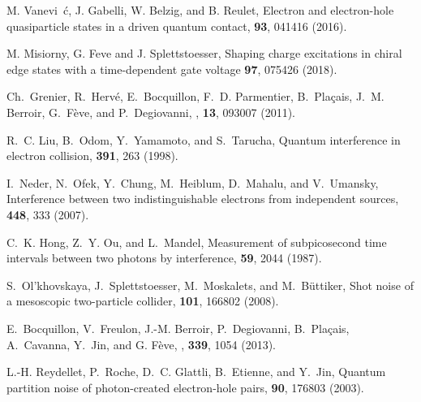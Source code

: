 \documentclass[aps,prb,superscriptaddress,preprint]{revtex4-1}
\begin{document}
\begin{thebibliography}{1}
		M. Vanevi\ifmmode~\else \'{c}\fi{}, J. Gabelli, W.
		Belzig, and B. Reulet,
		\newblock Electron and electron-hole quasiparticle states in a driven quantum
		contact,
		 {\bf 93}, 041416 (2016).
		
		
		
		
		M. Misiorny, G. Feve and J. Splettstoesser,
		\newblock Shaping charge excitations in chiral edge states with a time-dependent gate voltage
		 {\bf 97}, 075426 (2018).
		
		
		Ch.~Grenier, R.~Herv{\'e}, E.~Bocquillon, F.~D. Parmentier, B.~Pla\c{c}ais, J.~M.
		Berroir, G.~F{\`e}ve, and P.~Degiovanni,
		,
		 {\bf 13}, 093007 (2011).
		
		R.~C. Liu, B.~Odom, Y.~Yamamoto, and S.~Tarucha,
		\newblock Quantum interference in electron collision,
		  {\bf 391}, 263 (1998).
		
		I.~Neder, N.~Ofek, Y.~Chung, M.~Heiblum, D.~Mahalu, and V.~Umansky,
		\newblock Interference between two indistinguishable electrons from independent
		sources,
		 {\bf 448}, 333 (2007).
		
		C.~K. Hong, Z.~Y. Ou, and L.~Mandel,
		\newblock Measurement of subpicosecond time intervals between two photons by
		interference,
		 {\bf 59}, 2044 (1987).
		
		S.~Ol'khovskaya, J.~Splettstoesser, M.~Moskalets, and M.~B\"uttiker,
		\newblock Shot noise of a mesoscopic two-particle collider,
		 {\bf 101}, 166802 (2008).
		
		E.~Bocquillon, V.~Freulon, J.-M. Berroir, P.~Degiovanni, B.~Pla\c{c}ais, A.~Cavanna, Y.~Jin, and G. F{\`e}ve,
		,
		 {\bf 339}, 1054 (2013).
		
		
		
		L.-H. Reydellet, P.~Roche, D.~C. Glattli, B.~Etienne, and Y.~Jin,
		\newblock Quantum partition noise of photon-created electron-hole pairs,
		 {\bf 90}, 176803 (2003).
		

\end{thebibliography}
\end{document}
